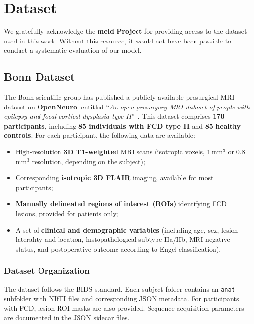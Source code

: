 \documentclass[FCD_GNN.tex]{subfiles}
\begin{document}
\chapter{Dataset}

We gratefully acknowledge the \textbf{\ac{meld} Project} for providing access to the dataset used in this work. 
Without this resource, it would not have been possible to conduct a systematic evaluation of our model.

\section{Bonn Dataset}

The Bonn scientific group has published a publicly available presurgical MRI dataset on \textbf{OpenNeuro}, entitled 
“\textit{An open presurgery MRI dataset of people with epilepsy and focal cortical dysplasia type II}”~\cite{Rueber2023_BonnFCDDataset}.  
This dataset comprises \textbf{170 participants}, including \textbf{85 individuals with FCD type II} and \textbf{85 healthy controls}. 
For each participant, the following data are available:

\begin{itemize}
    \item High-resolution \textbf{3D T1-weighted} MRI scans (isotropic voxels, 1\,mm$^{3}$ or 0.8\,mm$^{3}$ resolution, depending on the subject);
    \item Corresponding \textbf{isotropic 3D FLAIR} imaging, available for most participants;
    \item \textbf{Manually delineated regions of interest (ROIs)} identifying FCD lesions, provided for patients only;
    \item A set of \textbf{clinical and demographic variables} (including age, sex, lesion laterality and location, histopathological subtype IIa/IIb, MRI-negative status, and postoperative outcome according to Engel classification).
\end{itemize}

\subsection*{Dataset Organization}
The dataset follows the BIDS standard. Each subject folder contains an \texttt{anat} subfolder with NIfTI files and corresponding JSON metadata. 
For participants with FCD, lesion ROI masks are also provided. Sequence acquisition parameters are documented in the JSON sidecar files.  
\end{document}
